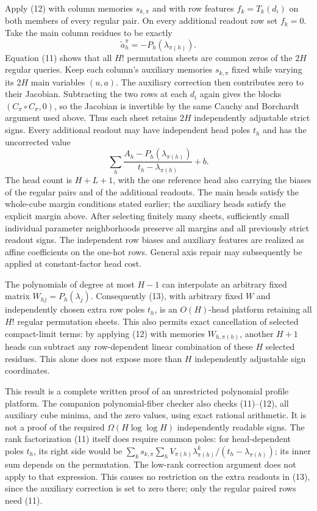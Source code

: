 \documentclass[11pt]{article}
\begin{document}
Apply (12) with column memories $s_{k,\pi}$ and with row features
$f_k=T_k(d_i)$ on both members of every regular pair. On every
additional readout row set $f_k=0$. Take the main column residues to
be exactly
\[
 \widetilde a_h^\pi=-P_h(\lambda_{\pi(h)}).
\]
Equation (11) shows that all $H!$ permutation sheets are common
zeros of the $2H$ regular queries. Keep each column's auxiliary
memories $s_{k,\pi}$ fixed while varying its $2H$ main variables
$(u,a)$. The auxiliary correction then contributes zero to their
Jacobian. Subtracting the two rows at each $d_i$ again gives the
blocks $(C_\pi\circ C_\pi,0)$, so the Jacobian is invertible by
the same Cauchy and Borchardt argument used above. Thus each sheet
retains $2H$ independently adjustable strict signs. Every additional
readout may have independent head poles $t_h$ and has the uncorrected value
\[
 \sum_h\frac{A_h-P_h(\lambda_{\pi(h)})}
                   {t_h-\lambda_{\pi(h)}}+b.
 \tag{13}
\]
The head count is $H+L+1$, with the one reference head also carrying
the biases of the regular pairs and of the additional readouts.
The main heads satisfy the whole-cube margin conditions stated
earlier; the auxiliary heads satisfy the explicit margin above.
After selecting finitely many sheets, sufficiently small individual
parameter neighborhoods preserve all margins and all previously
strict readout signs. The independent row biases and auxiliary
features are realized as affine coefficients on the one-hot rows.
General axis repair may subsequently be applied at constant-factor
head cost.

The polynomials of degree at most $H-1$ can interpolate an arbitrary
fixed matrix $W_{hj}=P_h(\lambda_j)$. Consequently (13), with arbitrary
fixed $W$ and independently chosen extra row poles $t_h$, is an
$O(H)$-head platform retaining all $H!$ regular permutation sheets.
This also permits exact cancellation of selected compact-limit
terms: by applying (12) with memories $W_{h,\pi(h)}$, another $H+1$
heads can subtract any row-dependent linear combination of these
$H$ selected residues. This alone does not expose more than $H$
independently adjustable sign coordinates.

This result is a complete written proof of an unrestricted polynomial
profile platform. The companion polynomial-fiber checker also checks
(11)--(12), all auxiliary cube minima, and the zero values, using
exact rational arithmetic. It is not a proof of the required
$\Omega(H\log\log H)$ independently readable signs. The rank
factorization (11) itself does require common poles: for head-dependent
poles $t_h$, its right side would be
$\sum_k s_{k,\pi}\sum_h V_{\pi(h)}\lambda_{\pi(h)}^k/
(t_h-\lambda_{\pi(h)})$; its inner sum depends on the permutation.
The low-rank correction argument does not apply to that expression.
This causes no restriction on the extra readouts in (13), since the
auxiliary correction is set to zero there; only the regular paired
rows need (11).
\end{document}

